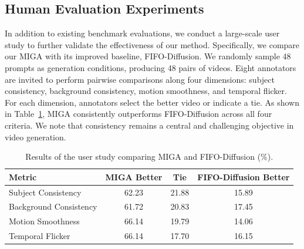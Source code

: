 \documentclass{llmxive}
\begin{document}
\subsection{Human Evaluation Experiments}
\label{app:user_study}

In addition to existing benchmark evaluations, we conduct a large-scale user study to further validate the effectiveness of our method.
Specifically, we compare our MIGA with its improved baseline, FIFO-Diffusion. We randomly sample 48 prompts as generation conditions, producing 48 pairs of videos. Eight annotators are invited to perform pairwise comparisons along four dimensions: subject consistency, background consistency, motion smoothness, and temporal flicker. For each dimension, annotators select the better video or indicate a tie. As shown in Table~\ref{tab:user_study}, MIGA consistently outperforms FIFO-Diffusion across all four criteria. We note that consistency remains a central and challenging objective in video generation.

\begin{table}[htbp]
    \centering
    \small
    \begin{tabular}{lccc}
        \toprule
        \textbf{Metric} & \textbf{MIGA Better} & \textbf{Tie} & \textbf{FIFO-Diffusion Better} \\
        \midrule
        Subject Consistency     & 62.23 & 21.88 & 15.89 \\
        Background Consistency  & 61.72 & 20.83 & 17.45 \\
        Motion Smoothness       & 66.14 & 19.79 & 14.06 \\
        Temporal Flicker        & 66.14 & 17.70 & 16.15 \\
        \bottomrule
    \end{tabular}
\caption{Results of the user study comparing MIGA and FIFO-Diffusion (\%).}
\label{tab:user_study}
\end{table}




\end{document}
